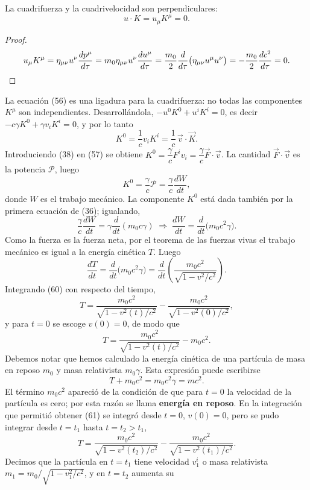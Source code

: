 \begin{proposicionc}
La cuadrifuerza y la cuadrivelocidad son perpendiculares:
\[
u\cdot K = u_\mu K^\mu = 0 . \tag{56}
\]
\end{proposicionc}

\begin{proof}
\[
u_\mu K^\mu = \eta_{\mu\nu}u^\nu\frac{dp^\mu}{d\tau} = m_0\eta_{\mu\nu}
u^\nu\frac{du^\mu}{d\tau} = \frac{m_0}{2}\frac{d}{d\tau}\big(\eta_{\mu\nu}
u^\mu u^\nu\big) = -\frac{m_0}{2}\frac{dc^2}{d\tau} = 0 . \qedhere
\]
\end{proof}

La ecuación (56) es una ligadura para la cuadrifuerza: no todas las
componentes $K^\mu$ son independientes. Desarrollándola,
$-u^0K^0+u^iK^i=0$, es decir $-c\gamma K^0+\gamma v_iK^i=0$, y por lo
tanto
\[
K^0 = \frac1c v_iK^i = \frac1c\,\vec v\cdot\vec K . \tag{57}
\]
Introduciendo (38) en (57) se obtiene $K^0=\dfrac{\gamma}{c}F^iv_i=
\dfrac\gamma c\vec F\cdot\vec v$. La cantidad $\vec F\cdot\vec v$ es la
potencia $\mathcal P$, luego
\[
K^0 = \frac\gamma c\mathcal P = \frac\gamma c\frac{dW}{dt}, \tag{58}
\]
donde $W$ es el trabajo mecánico. La componente $K^0$ está dada también
por la primera ecuación de (36); igualando,
\[
\frac\gamma c\frac{dW}{dt} = \gamma\frac{d}{dt}(m_0c\gamma)
\;\Longrightarrow\; \frac{dW}{dt} = \frac{d}{dt}\big(m_0c^2\gamma\big).
\tag{59}
\]
Como la fuerza es la fuerza neta, por el teorema de las fuerzas vivas el
trabajo mecánico es igual a la energía cinética $T$. Luego
\[
\frac{dT}{dt} = \frac{d}{dt}\big(m_0c^2\gamma\big) = \frac{d}{dt}\left(
\frac{m_0c^2}{\sqrt{1-v^2/c^2}}\right). \tag{60}
\]
Integrando (60) con respecto del tiempo,
\[
T = \frac{m_0c^2}{\sqrt{1-v^2(t)/c^2}}-\frac{m_0c^2}{\sqrt{1-v^2(0)/c^2}},
\tag{61}
\]
y para $t=0$ se escoge $v(0)=0$, de modo que
\[
T = \frac{m_0c^2}{\sqrt{1-v^2(t)/c^2}}-m_0c^2 . \tag{62}
\]
Debemos notar que hemos calculado la energía cinética de una partícula
de masa en reposo $m_0$ y masa relativista $m_0\gamma$. Esta expresión
puede escribirse
\[
T+m_0c^2 = m_0c^2\gamma = mc^2 . \tag{63}
\]
El término $m_0c^2$ apareció de la condición de que para $t=0$ la
velocidad de la partícula es cero; por esta razón se llama \textbf{energía
en reposo}. En la integración que permitió obtener (61) se integró desde
$t=0$, $v(0)=0$, pero se pudo integrar desde $t=t_1$ hasta $t=t_2>t_1$,
\[
T = \frac{m_0c^2}{\sqrt{1-v^2(t_2)/c^2}}-\frac{m_0c^2}{\sqrt{1-v^2(t_1)/
c^2}}. \tag{64}
\]
Decimos que la partícula en $t=t_1$ tiene velocidad $v^i_1$ o masa
relativista $m_1=m_0/\sqrt{1-v_1^2/c^2}$, y en $t=t_2$ aumenta su
